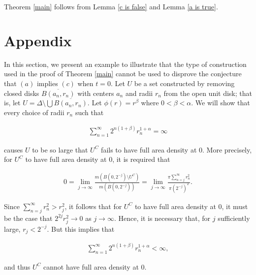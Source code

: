 \documentclass{article}
\theoremstyle{definition}
\begin{document}
Theorem \ref{main} follows from Lemma \ref{c is false} and Lemma \ref{a is true}.



\section*{Appendix}

In this section, we present an example to illustrate that the type of construction used in the proof of Theorem \ref{main} cannot be used to disprove the conjecture that $(a)$ implies $(c)$ when $t=0$. Let $U$ be a set constructed by removing closed disks $\overline{B(a_n,r_n)}$ with centers $a_n$ and radii $r_n$ from the open unit disk; that is, let $U = \Delta \setminus \bigcup \overline{B(a_n,r_n)}$. Let $\phi(r) = r^{\beta}$ where $0 < \beta < \alpha$. We will show that every choice of radii $r_n$ such that

\begin{align*}
    \sum_{n=1}^{\infty} 2^{n(1+\beta)} r_n^{1+\alpha} = \infty
\end{align*}

\bigskip
\noindent causes $U$ to be so large that $U^C$ fails to have full area density at $0$. More precisely, for $U^C$ to have full area density at $0$, it is required that

\begin{align*}
    0 = \lim_{j\to \infty} \frac{m(B(0,2^{-j})\setminus U^C)}{m(B(0,2^{-j}))} = \lim_{j\to \infty} \frac{\pi \sum_{n=j}^{\infty} r_n^2}{\pi (2^{-j})^2}.
\end{align*}

\bigskip
\noindent Since $\displaystyle \sum_{n=j}^{\infty} r_n^2> r_j^2$, it follows that for $U^C$ to have full area density at $0$, it must be the case that $2^{2j} r_j^2 \to 0$ as $j \to \infty$. Hence, it is necessary that, for $j$ sufficiently large, $r_j < 2^{-j}$. But this implies that

\begin{align*}
    \sum_{n=1}^{\infty} 2^{n(1+\beta)} r_n^{1+\alpha} < \infty,
\end{align*}

\bigskip
\noindent and thus $U^C$ cannot have full area density at $0$.





\end{document}
